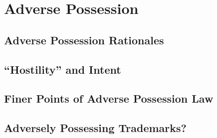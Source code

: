 \chapter{Adverse Possession}



\section{Adverse Possession Rationales}





\begin{questions}



\end{questions}



\section{``Hostility'' and Intent}







\begin{questions}

\end{questions}

\section{Finer Points of Adverse Possession Law}





\section{Adversely Possessing Trademarks?}




\begin{questions}

\end{questions}

